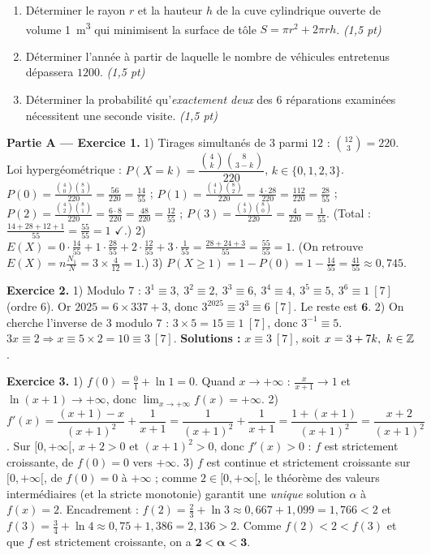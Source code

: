 \begin{enumerate}[label=\textbf{Tâche \arabic*.},leftmargin=2.4em]
\item Déterminer le rayon $r$ et la hauteur $h$ de la cuve cylindrique ouverte de volume
\SI{1}{\cubic\metre} qui minimisent la surface de tôle $S=\pi r^2+2\pi r h$. \hfill\textit{(1,5 pt)}
\item Déterminer l'année à partir de laquelle le nombre de véhicules entretenus dépassera $1200$. \hfill\textit{(1,5 pt)}
\item Déterminer la probabilité qu'\emph{exactement deux} des $6$ réparations examinées nécessitent une seconde visite. \hfill\textit{(1,5 pt)}
\end{enumerate}
\par{}


\noindent\textbf{Partie A — Exercice 1.}
1) Tirages simultanés de $3$ parmi $12$ : $\binom{12}{3}=220$. Loi hypergéométrique :
$P(X{=}k)=\dfrac{\binom4k\binom{8}{3-k}}{220}$, $k\in\{0,1,2,3\}$.
$P(0)=\frac{\binom40\binom83}{220}=\frac{56}{220}=\frac{14}{55}$ ;
$P(1)=\frac{\binom41\binom82}{220}=\frac{4\cdot28}{220}=\frac{112}{220}=\frac{28}{55}$ ;
$P(2)=\frac{\binom42\binom81}{220}=\frac{6\cdot8}{220}=\frac{48}{220}=\frac{12}{55}$ ;
$P(3)=\frac{\binom43\binom80}{220}=\frac{4}{220}=\frac{1}{55}$.
(Total : $\frac{14+28+12+1}{55}=\frac{55}{55}=1$ $\checkmark$.)
2) $E(X)=0\cdot\frac{14}{55}+1\cdot\frac{28}{55}+2\cdot\frac{12}{55}+3\cdot\frac{1}{55}=\frac{28+24+3}{55}=\frac{55}{55}=1$.
(On retrouve $E(X)=n\frac{N_1}{N}=3\times\frac{4}{12}=1$.)
3) $P(X\ge1)=1-P(0)=1-\frac{14}{55}=\frac{41}{55}\approx0{,}745$.

\noindent\textbf{Exercice 2.}
1) Modulo $7$ : $3^1\equiv3,\ 3^2\equiv2,\ 3^3\equiv6,\ 3^4\equiv4,\ 3^5\equiv5,\ 3^6\equiv1\ [7]$
(ordre $6$). Or $2025=6\times337+3$, donc $3^{2025}\equiv3^{3}\equiv6\ [7]$. Le reste est $\mathbf{6}$.
2) On cherche l'inverse de $3$ modulo $7$ : $3\times5=15\equiv1\ [7]$, donc $3^{-1}\equiv5$.
$3x\equiv2\Rightarrow x\equiv5\times2=10\equiv3\ [7]$. \textbf{Solutions :} $x\equiv3\ [7]$, soit $x=3+7k,\ k\in\mathbb{Z}$.

\noindent\textbf{Exercice 3.}
1) $f(0)=\frac{0}{1}+\ln1=0$. Quand $x\to+\infty$ : $\frac{x}{x+1}\to1$ et $\ln(x+1)\to+\infty$,
donc $\displaystyle\lim_{x\to+\infty}f(x)=+\infty$.
2) $f'(x)=\dfrac{(x+1)-x}{(x+1)^2}+\dfrac{1}{x+1}=\dfrac{1}{(x+1)^2}+\dfrac{1}{x+1}
=\dfrac{1+(x+1)}{(x+1)^2}=\dfrac{x+2}{(x+1)^2}$.
Sur $[0,+\infty[$, $x+2>0$ et $(x+1)^2>0$, donc $f'(x)>0$ : $f$ est strictement croissante,
de $f(0)=0$ vers $+\infty$.
3) $f$ est continue et strictement croissante sur $[0,+\infty[$, de $f(0)=0$ à $+\infty$ ;
comme $2\in[0,+\infty[$, le théorème des valeurs intermédiaires (et la stricte monotonie)
garantit une \emph{unique} solution $\alpha$ à $f(x)=2$.
Encadrement : $f(2)=\frac{2}{3}+\ln3\approx0{,}667+1{,}099=1{,}766<2$ et
$f(3)=\frac{3}{4}+\ln4\approx0{,}75+1{,}386=2{,}136>2$. Comme $f(2)<2<f(3)$ et que $f$ est
strictement croissante, on a $\mathbf{2<\alpha<3}$.

